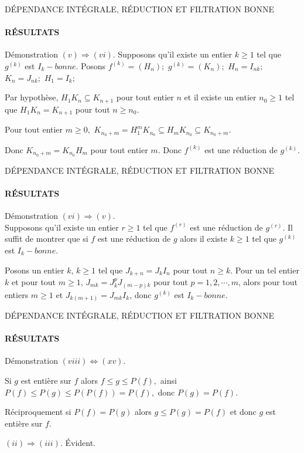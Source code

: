 \documentclass[11pt,a4paper]{beamer}
\begin{document}
\begin{frame}{DÉPENDANCE INTÉGRALE, RÉDUCTION ET FILTRATION BONNE}
	\framesubtitle{RÉSULTATS}
	\begin{block}{Démonstration}
		$(v)\Longrightarrow (vi).$
		Supposons qu'il existe un entier $k\geq 1$ tel que $g^{(k)}$ est $I_{k}-bonne$.
		Posons $f^{(k)}=(H_{n});$ $g^{(k)}=(K_{n});$ $H_{n}=I_{nk};$ $K_{n}=J_{nk};$ 
		$H_{1}=I_{k};$
		
		Par hypothèse, $H_{1}K_{n}\subseteq K_{n+1}$ pour tout entier $n$ et il
		existe un entier $n_{0}\geq 1$ tel que $H_{1}K_{n}=K_{n+1}$ pour tout $n\geq
		n_{0}.$
		
		Pour tout entier $m\geq 0,$ $K_{n_{0}+m}=H_{1}^{m}K_{n_{0}}\subseteq
		H_{m}K_{n_{0}}\subseteq K_{n_{0}+m}.$
		
		Donc $K_{n_{0}+m}=K_{n_{0}}H_{m}$ pour tout entier $m.$ Donc $f^{(k)}$
		est une réduction de $g^{(k)}.$
		
	\end{block}
\end{frame}

\begin{frame}{DÉPENDANCE INTÉGRALE, RÉDUCTION ET FILTRATION BONNE}
	\framesubtitle{RÉSULTATS}
	\begin{block}{Démonstration}
		$(vi)\Longrightarrow (v).$\\ Supposons qu'il existe un entier $r\geq 1$ tel que $f^{(r)}$ est une réduction de $g^{(r)}.$
		Il suffit de montrer que si $f$ est une réduction de $g$ alors il existe 
		$k\geq 1$ tel que $g^{(k)}$ est $I_{k}-bonne.$
		
		Posons un entier $k$, $k \geqslant 1$ tel que $J_{k+n}  = J_{k}I_n$ pour tout $n \geqslant k$. Pour un tel entier $k$ et pour tout $m \geqslant 1$, $J_{mk}=J_{k}^{p}J_{(m-p)k}
		$ pour tout $p=1,2,\cdots,m$, alors pour tout entiers $m\geq 1$ et  $J_{k(m+1)}=J_{mk}I_{k}$, donc $g^{(k)}$ est $I_{k}-bonne.$
	\end{block}
\end{frame}

\begin{frame}{DÉPENDANCE INTÉGRALE, RÉDUCTION ET FILTRATION BONNE}
	\framesubtitle{RÉSULTATS}
	\begin{block}{Démonstration}
		$(viii)\Longleftrightarrow (xv).$
		
		Si $g$ est entière sur $f$ alors $f\leq g\leq P(f),$ ainsi $P(f)\leq P(g)\leq P(P(f))=P(f),$ donc $P(g)=P(f).$
		
		Réciproquement si $P(f)=P(g)$ alors $g\leq P(g)=P(f)$ et donc $g$ est entière sur $f.$
		
		$(ii)\Longrightarrow (iii).$
		Évident.
	\end{block}
\end{frame}
\end{document}
